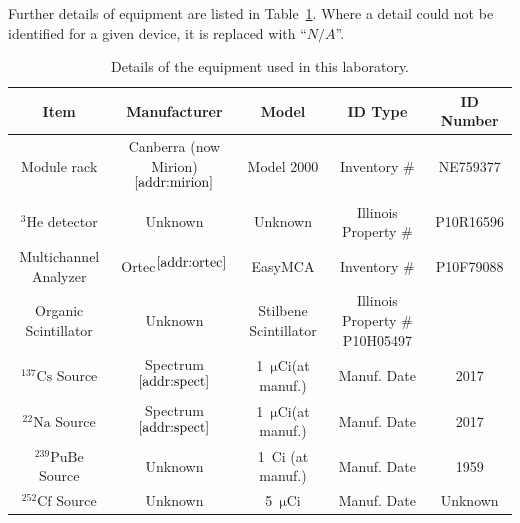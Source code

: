 \documentclass[12pt]{article}
\newcommand{\micCi}{$\mathrm{\mu Ci}$\xspace}
\newcommand{\CsSrc}{$\mathrm{^{137}Cs}$\xspace}
\newcommand{\NaSrc}{$\mathrm{^{22}Na}$\xspace}
\newcommand{\PuBe}{$\mathrm{^{239}PuBe}$\xspace}
\newcommand{\CfSrc}{$\mathrm{^{252}Cf}$\xspace}
\newcommand{\HeThree}{$\mathrm{^3He}$\xspace}
\begin{document}
\newcommand{\na}{$N/A$}
\newcommand{\sref}[1]{$^{\ref{#1}}$}
\FloatBarrier
Further details of equipment are listed in Table~\ref{tab:equip}.
Where a detail could not be identified for a given device, it is replaced with ``\na''.
\begin{table}[!h]
    \centering
    \small
    \caption{Details of the equipment used in this laboratory.}
    \label{tab:equip}
    \scriptsize
    \begin{tabular}{c|cccc}
        Item & Manufacturer & Model & ID Type & ID Number\\\hline
        Module rack & Canberra (now Mirion)\sref{addr:mirion}& Model 2000 & Inventory \# & NE759377 \\
        \HeThree detector & Unknown & Unknown & Illinois Property \# & P10R16596 \\
        Multichannel Analyzer & Ortec\sref{addr:ortec} & EasyMCA & Inventory \# & P10F79088 \\
        Organic Scintillator & Unknown & Stilbene Scintillator & Illinois Property \# P10H05497 \\

        \CsSrc Source & Spectrum\sref{addr:spect} & 1~\micCi (at manuf.) & Manuf. Date & 2017 \\
        \NaSrc Source & Spectrum\sref{addr:spect} & 1~\micCi (at manuf.) & Manuf. Date & 2017 \\
        \PuBe Source & Unknown & 1~Ci (at manuf.) & Manuf. Date & 1959 \\
        \CfSrc Source & Unknown & 5~\micCi & Manuf. Date & Unknown \\


\end{tabular}
\end{table}
\end{document}
